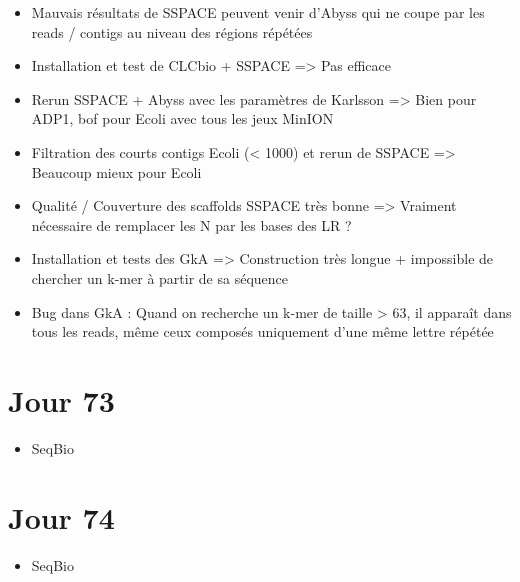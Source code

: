 \documentclass[12pt]{report}
\begin{document}
\begin{itemize}
	\item Mauvais résultats de SSPACE peuvent venir d'Abyss qui ne coupe par les reads / contigs au niveau des régions répétées

	\item Installation et test de CLCbio + SSPACE => Pas efficace
	
	\item Rerun SSPACE + Abyss avec les paramètres de Karlsson => Bien pour ADP1, bof pour Ecoli avec tous les jeux MinION
	
	\item Filtration des courts contigs Ecoli (< 1000) et rerun de SSPACE => Beaucoup mieux pour Ecoli
	
	\item Qualité / Couverture des scaffolds SSPACE très bonne => Vraiment nécessaire de remplacer les N par les bases des LR ?

	\item Installation et tests des GkA => Construction très longue + impossible de chercher un k-mer à partir de sa séquence
	
	\item Bug dans GkA : Quand on recherche un k-mer de taille > 63, il apparaît dans tous les reads, même ceux composés uniquement d'une même lettre répétée
\end{itemize}

\section{Jour 73}

\begin{itemize}
	\item SeqBio
\end{itemize}

\section{Jour 74}

\begin{itemize}
	\item SeqBio
\end{itemize}
\end{document}
